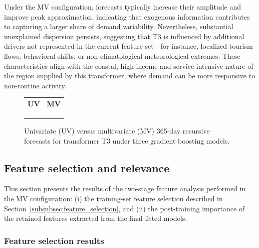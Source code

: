 Under the MV configuration, forecasts typically increase their amplitude and improve peak approximation, indicating that exogenous information contributes to capturing a larger share of demand variability. Nevertheless, substantial unexplained dispersion persists, suggesting that T3 is influenced by additional drivers not represented in the current feature set---for instance, localized tourism flows, behavioral shifts, or non-climatological meteorological extremes. These characteristics align with the coastal, high-income and service-intensive nature of the region supplied by this transformer, where demand can be more responsive to non-routine activity.

\begin{figure}[!h]
\centering
\setlength{\tabcolsep}{3pt}
\renewcommand{\arraystretch}{1.0}
\begin{tabular}{cc}
\textbf{UV} & \textbf{MV} \\
 &
 \\
 &
 \\
 &
 \\
\end{tabular}
\caption{Univariate (UV) versus multivariate (MV) 365-day recursive forecasts for transformer T3 under three gradient boosting models.}
\label{fig:matrix_T3}
\end{figure}

\subsection{Feature selection and relevance}
\label{subsec:feature_importance}

This section presents the results of the two-stage feature analysis performed in the MV configuration: (i) the training-set feature selection described in Section~\ref{subsubsec:feature_selection}, and (ii) the post-training importance of the retained features extracted from the final fitted models.

\subsubsection{Feature selection results}

